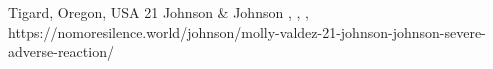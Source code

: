           {
            Tigard, Oregon, USA
          }
          {
            21
          }
          {
            Johnson \& Johnson
          }
          {
          }
          {
            ,
            ,
            ,
          }
          {
            https://nomoresilence.world/johnson/molly-valdez-21-johnson-johnson-severe-adverse-reaction/
          }

